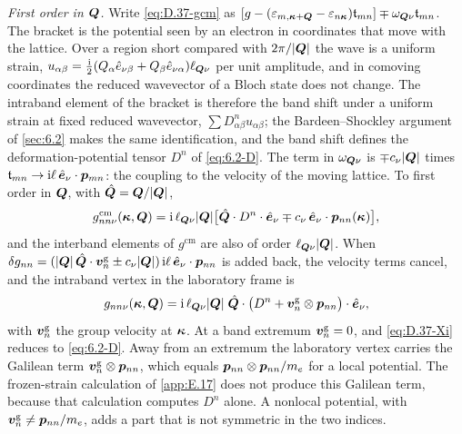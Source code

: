 \emph{First order in $\bm{Q}$.} Write \cref{eq:D.37-gcm} as $[g - (\varepsilon_{m,\bm{\kappa}+\bm{Q}} - \varepsilon_{n\bm{\kappa}})\mathfrak{t}_{mn}] \mp \omega_{\bm{Q}\nu}\mathfrak{t}_{mn}$. The bracket is the potential seen by an electron in coordinates that move with the lattice. Over a region short compared with $2\pi/|\bm{Q}|$ the wave is a uniform strain, $u_{\alpha\beta} = \frac{\mathrm{i}}{2}(Q_\alpha\hat e_{\nu\beta} + Q_\beta\hat e_{\nu\alpha})\ell_{\bm{Q}\nu}$ per unit amplitude, and in comoving coordinates the reduced wavevector of a Bloch state does not change. The intraband element of the bracket is therefore the band shift under a uniform strain at fixed reduced wavevector, $\sum D^n_{\alpha\beta}u_{\alpha\beta}$; the Bardeen--Shockley argument of \cref{sec:6.2} makes the same identification, and the band shift defines the deformation-potential tensor $D^n$ of \cref{eq:6.2-D}. The term in $\omega_{\bm{Q}\nu}$ is $\mp c_\nu|\bm{Q}|$ times $\mathfrak{t}_{mn} \to \mathrm{i}\ell\,\hat{\bm{e}}_\nu\cdot\bm{p}_{mn}$: the coupling to the velocity of the moving lattice. To first order in $\bm{Q}$, with $\hat{\bm{Q}} = \bm{Q}/|\bm{Q}|$,
\begin{equation}
  g^{\mathrm{cm}}_{nn\nu}(\bm{\kappa},\bm{Q}) = \mathrm{i}\,\ell_{\bm{Q}\nu}|\bm{Q}|\bigl[\hat{\bm{Q}}\cdot D^n\cdot\hat{\bm{e}}_\nu \mp c_\nu\,\hat{\bm{e}}_\nu\cdot\bm{p}_{nn}(\bm{\kappa})\bigr] ,
  \label{eq:D.37-gcmnn}
\end{equation}
and the interband elements of $g^{\mathrm{cm}}$ are also of order $\ell_{\bm{Q}\nu}|\bm{Q}|$. When $\delta g_{nn} = (|\bm{Q}|\,\hat{\bm{Q}}\cdot\bm{v}^{\mathrm{g}}_n \pm c_\nu|\bm{Q}|)\,\mathrm{i}\ell\,\hat{\bm{e}}_\nu\cdot\bm{p}_{nn}$ is added back, the velocity terms cancel, and the intraband vertex in the laboratory frame is
\begin{equation}
  g_{nn\nu}(\bm{\kappa},\bm{Q}) = \mathrm{i}\,\ell_{\bm{Q}\nu}|\bm{Q}|\;\hat{\bm{Q}}\cdot\bigl(D^n + \bm{v}^{\mathrm{g}}_n\otimes\bm{p}_{nn}\bigr)\cdot\hat{\bm{e}}_\nu ,
  \label{eq:D.37-Xi}
\end{equation}
with $\bm{v}^{\mathrm{g}}_n$ the group velocity at $\bm{\kappa}$. At a band extremum $\bm{v}^{\mathrm{g}}_n = 0$, and \cref{eq:D.37-Xi} reduces to \cref{eq:6.2-D}. Away from an extremum the laboratory vertex carries the Galilean term $\bm{v}^{\mathrm{g}}_n\otimes\bm{p}_{nn}$, which equals $\bm{p}_{nn}\otimes\bm{p}_{nn}/m_e$ for a local potential. The frozen-strain calculation of \cref{app:E.17} does not produce this Galilean term, because that calculation computes $D^n$ alone. A nonlocal potential, with $\bm{v}^{\mathrm{g}}_n \ne \bm{p}_{nn}/m_e$, adds a part that is not symmetric in the two indices.

